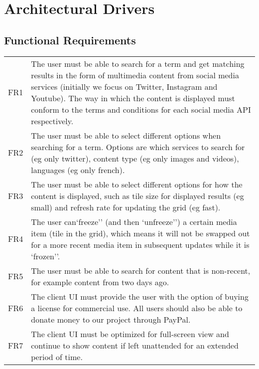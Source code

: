 \label{ad}
\chapter{Architectural Drivers}

\section{Functional Requirements}
{\tabulinesep=1.4mm
\begin{tabu}{|l|l|}
\hline
{}
 \\
\hline
\taburowcolors{}
FR1 & \parbox[t]{105mm}{The user must be able to search for a term and get
   matching results in the form of multimedia content from social media services
   (initially we focus on Twitter, Instagram and Youtube). The way in which the
   content is displayed must conform to the terms and conditions for each social
   media API respectively.} \\
\hline
FR2 & \parbox[t]{105mm}{The user must be able to select different options when
   searching for a term. Options are which services to search for (eg only
   twitter), content type (eg only images and videos), languages (eg only
   french).} \\
\hline
FR3 & \parbox[t]{105mm}{The user must be able to select different options for
   how the content is displayed, such as tile size for displayed results
   (eg small) and refresh rate for updating the grid (eg fast).} \\
\hline
FR4 & \parbox[t]{105mm}{The user can`freeze'' (and then `unfreeze'') a certain
   media item (tile in the grid), which means it will not be swapped out for a
   more recent media item in subsequent updates while it is `frozen''.} \\
\hline
FR5 & \parbox[t]{105mm}{The user must be able to search for content that is
   non-recent, for example content from two days ago.} \\
\hline
FR6 & \parbox[t]{105mm}{The client UI must provide the user with the option of
   buying a license for commercial use. All users should also be able to donate
   money to our project through PayPal.} \\
\hline
FR7 & \parbox[t]{105mm}{The client UI must be optimized for full-screen view and
   continue to show content if left unattended for an extended period of
   time.} \\
\hline
\end{tabu}} \\ \\
